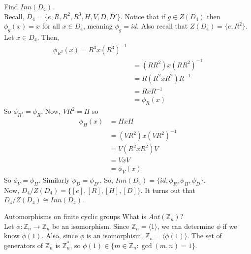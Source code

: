 \documentclass[12pt]{article}
\newcommand{\Z}{\mathbb{Z}}
\newcommand{\inv}{^{-1}}
\begin{document}
	\begin{myex}{}{}
		Find $Inn(D_4)$.\\
		
		Recall, $D_4=\{e, R, R^2, R^3, H, V, D, D'\}$. Notice that if $g\in Z(D_4)$ then $\phi_g(x)=x$ for all $x\in D_4$, meaning $\phi_g=id$. Also recall that $Z(D_4)=\{e, R^2\}$. Let $x\in D_4$. Then,
		\begin{align*}
			\phi_{R^3}(x)=R^3x(R^3)\inv\\
			&=(RR^2)x(RR^2)\inv\\
			&=R(R^2xR^2)R\inv\\
			&=RxR\inv\\
			&=\phi_R(x)
		\end{align*}
		So $\phi_{R^3}=\phi_R$. Now, $VR^2=H$ so
		\begin{align*}
			\phi_H(x)&=HxH\\
			&=(VR^2)x(VR^2)\inv\\
			&=V(R^2xR^2)V\\
			&=VxV\\
			&=\phi_V(x)
		\end{align*}
		So $\phi_V=\phi_H$. Similarly $\phi_D=\phi_{D'}$. So, $Inn(D_4)=\{id, \phi_R, \phi_H, \phi_D\}$.\\
		
		Now, $D_4/Z(D_4)=\{[e], [R], [H], [D]\}$. It turns out that $D_4/Z(D_4)\cong Inn(D_4)$.
	\end{myex}
	
	\begin{myex}{Automorphisms on finite cyclic groups}{}
		What is $Aut(\Z_n)$?\\
		
		Let $\phi:\Z_n\to\Z_n$ be an isomorphism. Since $\Z_n=\langle 1\rangle$, we can determine $\phi$ if we know $\phi(1)$. Also, since $\phi$ is an isomorphism, $\Z_n=\langle\phi(1)\rangle$. The set of generators of $\Z_n$ is $\Z_n^*$, so $\phi(1)\in\{m\in\Z_n:\gcd(m, n)=1\}$.
	\end{myex}
	
\end{document}
